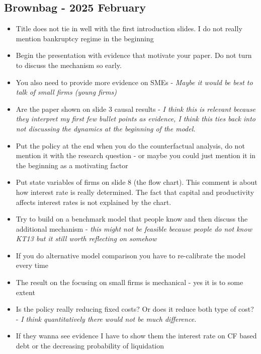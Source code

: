 \documentclass[12pt]{article}
\begin{document}
\subsection*{Brownbag - 2025 February} 
\begin{itemize} \setlength\itemsep{0em}  \small
    \item Title does not tie in well with the first introduction slides. I do not really mention bankruptcy regime in the beginning
    \item Begin the presentation with evidence that motivate your paper. Do not turn to discuss the mechanism so early. 
    \item You also need to provide more evidence on SMEs - \textit{Maybe it would be best to talk of small firms (young firms)}
    \item Are the paper shown on slide 3 causal results - \textit{I think this is relevant because they interpret my first few bullet points as evidence, I think this ties back into not discussing the dynamics at the beginning of the model.} 
    \item Put the policy at the end when you do the counterfactual analysis, do not mention it with the research question - or maybe you could just mention it in the beginning as a motivating factor
    \item Put state variables of firms on slide 8 (the flow chart). This comment is about how interest rate is really determined. The fact that capital and productivity affects interest rates is not explained by the chart. 
    \item Try to build on a benchmark model that people know and then discuss the additional mechanism - \textit{this might not be feasible because people do not know KT13 but it still worth reflecting on somehow}
    \item If you do alternative model comparison you have to re-calibrate the model every time
    \item The result on the focusing on small firms is mechanical - yes it is to some extent
    \item Is the policy really reducing fixed costs? Or does it reduce both type of cost? - \textit{I think quantitatively there would not be much difference.}
    \item If they wanna see evidence I have to show them the interest rate on CF based debt or the decreasing probability of liquidation
\end{itemize}
\end{document}
